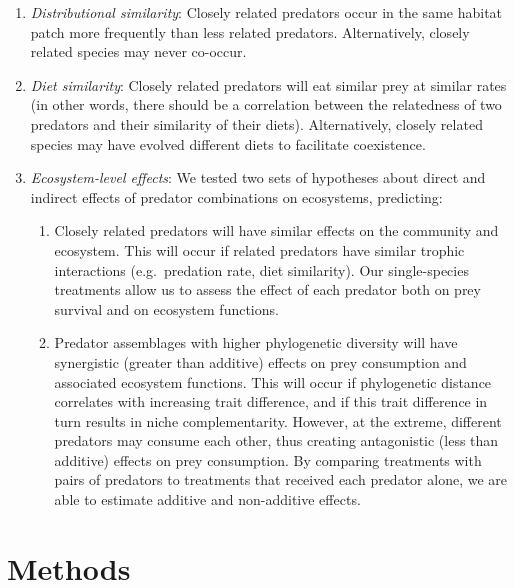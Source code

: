\documentclass[11pt]{article}
\begin{document}
\begin{enumerate}
\def\labelenumi{\arabic{enumi}.}
\item
  \emph{Distributional similarity}: Closely related predators occur in
  the same habitat patch more frequently than less related predators.
  Alternatively, closely related species may never co-occur.
\item
  \emph{Diet similarity}: Closely related predators will eat similar
  prey at similar rates (in other words, there should be a correlation between the relatedness of two predators and their similarity of their diets). Alternatively, closely related species may have
  evolved different diets to facilitate coexistence.
\item
  \emph{Ecosystem-level effects}: We tested two sets of hypotheses about
  direct and indirect effects of predator combinations on ecosystems,
  predicting:

  \begin{enumerate}
  \def\labelenumii{(\alph{enumii})}
  \item
    Closely related predators will have similar effects on the
    community and ecosystem. This will occur if related predators have similar trophic
    interactions (e.g.~predation rate, diet similarity). Our
    single-species treatments allow us to assess the effect of each
    predator both on prey survival and on ecosystem functions.
  \item
    Predator assemblages with higher phylogenetic diversity will have
    synergistic (greater than additive) effects on prey consumption and
    associated ecosystem functions. This will occur if phylogenetic
    distance correlates with increasing trait difference, and if this
    trait difference in turn results in niche complementarity. However,
    at the extreme, different predators may consume each other, thus
    creating antagonistic (less than additive) effects on prey
    consumption. By comparing treatments with pairs of predators to
    treatments that received each predator alone, we are able to
    estimate additive and non-additive effects.
  \end{enumerate}
\end{enumerate}


\section*{Methods}
\end{document}
